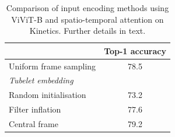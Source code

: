 \begin{table}[t]
	\centering
	\caption{Comparison of input encoding methods using ViViT-B and spatio-temporal attention on Kinetics. 
	Further details in text.
	}
	\vspace{.1em}
	\begin{tabular}{lc}
		\toprule
		& Top-1 accuracy \\ \midrule
		Uniform frame sampling 		& 78.5          \\  %
		\midrule
		\textit{Tubelet embedding} \\
		Random initialisation~\cite{glorot_aistats_2010}  			& 73.2          \\ %
		Filter inflation~\cite{carreira_cvpr_2017}      				  & 77.6          \\ %
		Central frame          				& 79.2          \\ %
		\bottomrule
	\end{tabular}
	\vspace{-4mm}
	\label{tab:ablation_input_encoding}
\end{table}


